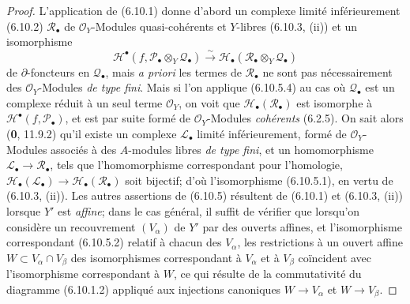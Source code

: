 \begin{proof}
L'application de (6.10.1) donne d'abord un complexe limité inférieurement
(6.10.2) $\mathscr R_\bullet$ de $\mathscr O_Y$-Modules quasi-cohérents et
$Y$-libres (6.10.3, (ii)) et un isomorphisme
\[
  \mathscr H^\bullet
  (f,\mathscr P_\bullet\otimes_Y\mathscr Q_\bullet)
  \xrightarrow{\sim}
  \mathscr H_\bullet
  (\mathscr R_\bullet\otimes_Y\mathscr Q_\bullet)
  \tag{6.10.5.4}\label{III.6.10.5.4.fr}
\]
de $\partial$-foncteurs en $\mathscr Q_\bullet$, mais \emph{a priori} les
termes de $\mathscr R_\bullet$ ne sont pas nécessairement des
$\mathscr O_Y$-Modules \emph{de type fini}. Mais si l'on applique (6.10.5.4) au cas
où $\mathscr Q_\bullet$ est un complexe réduit à un seul terme
$\mathscr O_Y$, on voit que $\mathscr H_\bullet(\mathscr R_\bullet)$ est
isomorphe à $\mathscr H^\bullet(f,\mathscr P_\bullet)$, et est par suite formé
de $\mathscr O_Y$-Modules \emph{cohérents} (6.2.5). On sait alors (\textbf{0}, 11.9.2) qu'il
existe un complexe $\mathscr L_\bullet$ limité inférieurement, formé de
$\mathscr O_Y$-Modules associés à des $A$-modules libres \emph{de type fini}, et un
homomorphisme $\mathscr L_\bullet\longrightarrow\mathscr R_\bullet$,
tels que l'homomorphisme correspondant pour l'homologie,
$\mathscr H_\bullet(\mathscr L_\bullet)\longrightarrow\mathscr H_\bullet(\mathscr R_\bullet)$
soit bijectif; d'où l'isomorphisme (6.10.5.1), en vertu de (6.10.3, (ii)).
Les autres assertions de (6.10.5) résultent de (6.10.1) et (6.10.3, (ii))
lorsque $Y'$ est \emph{affine}; dans le cas général, il suffit de vérifier que
lorsqu'on considère un recouvrement $(V_\alpha)$ de $Y'$ par des ouverts
affines, et l'isomorphisme correspondant (6.10.5.2) relatif à chacun des
$V_\alpha$, les restrictions à un ouvert affine
$W\subset V_\alpha\cap V_\beta$ des isomorphismes correspondant à
$V_\alpha$ et à $V_\beta$ coïncident avec l'isomorphisme correspondant à
$W$, ce qui résulte de la commutativité du diagramme (6.10.1.2) appliqué aux
injections canoniques $W\to V_\alpha$ et $W\to V_\beta$.
\end{proof}


